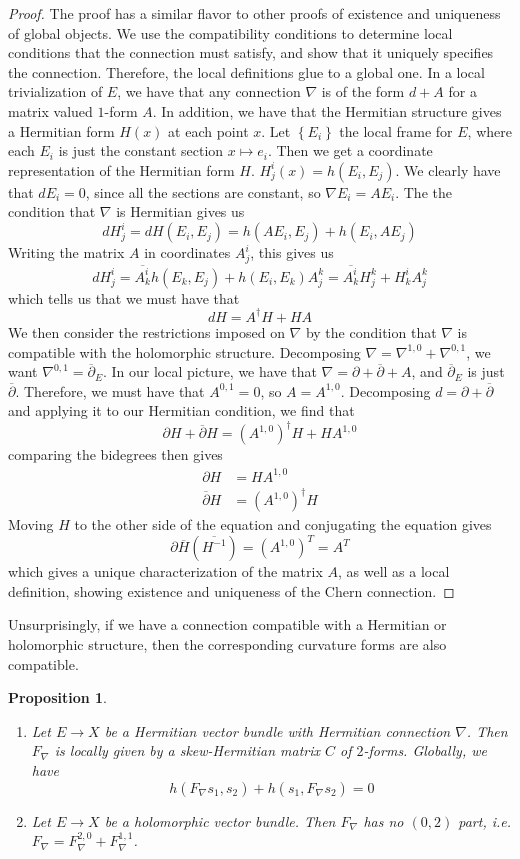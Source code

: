 \documentclass[psamsfonts, 12pt]{amsart}
\newtheorem{prop}[thm]{Proposition}
\theoremstyle{definition}
\theoremstyle{remark}
\newcommand{\dbar}{\overline{\partial}}
\newcommand{\inv}{^{-1}}
\newcommand{\set}[1]{\left\lbrace #1 \right\rbrace}
\newcommand{\enumbreak}{\ \\ \vspace{-\baselineskip}}
\begin{document}
\begin{proof}
The proof has a similar flavor to other proofs of existence and uniqueness of global
objects. We use the compatibility conditions to determine local conditions that
the connection must satisfy, and show that it uniquely specifies the connection.
Therefore, the local definitions glue to a global one. In a local trivialization
of $E$, we have that any connection $\nabla$ is of the form $d + A$ for a matrix
valued $1$-form $A$. In addition, we have that the Hermitian structure gives a
Hermitian form $H(x)$ at each point $x$. Let $\set{E_i}$ the local
frame for $E$, where each $E_i$ is just the constant section $x \mapsto e_i$. Then we
get a coordinate representation of the Hermitian form $H$.
$H^i_j(x) = h(E_i,E_j)$. We clearly have that $dE_i = 0$, since all the sections
are constant, so $\nabla E_i = AE_i$. The the condition that $\nabla$ is Hermitian gives
us
\[
dH^i_j  = dH(E_i,E_j) = h(AE_i, E_j) + h(E_i, AE_j)
\]
Writing the matrix $A$ in coordinates $A^i_j$, this gives us
\[
dH^i_j = \overline{A^i_k}h(E_k, E_j) + h(E_i, E_k)A^k_j
= \overline{A^i_k}H^k_j + H^i_kA^k_j
\]
which tells us that we must have that
\[
dH = A^\dagger H + HA
\]
We then consider the restrictions imposed on $\nabla$ by the condition that
$\nabla$ is compatible with the holomorphic structure. Decomposing
$\nabla = \nabla^{1,0} + \nabla^{0,1}$, we want $\nabla^{0,1} = \dbar_E$. In our local
picture, we have that $\nabla = \partial + \dbar + A$, and $\dbar_E$ is just $\dbar$.
Therefore, we must have that $A^{0,1} = 0$, so $A = A^{1,0}$. Decomposing
$d = \partial + \dbar$ and applying it to our Hermitian condition, we find that
\[
\partial H + \dbar H = (A^{1,0})^\dagger H + HA^{1,0}
\]
comparing the bidegrees then gives
\begin{align*}
\partial H &= HA^{1,0}\\
\dbar H &= (A^{1,0})^\dagger H
\end{align*}
Moving $H$ to the other side of the equation and conjugating the equation gives
\[
\partial\overline{H} (\overline{H\inv}) = (A^{1,0})^T = A^T
\]
which gives a unique characterization of the matrix $A$, as well as a local definition,
showing existence and uniqueness of the Chern connection.
\end{proof}
%
Unsurprisingly, if we have a connection compatible with a Hermitian or holomorphic
structure, then the corresponding curvature forms are also compatible.
%
\begin{prop} \enumbreak
\begin{enumerate}
  \item Let $E \to X$ be a Hermitian vector bundle with Hermitian connection $\nabla$.
  Then $F_\nabla$ is locally given by a skew-Hermitian matrix $C$ of $2$-forms.
  Globally, we have
  \[
  h(F_\nabla s_1, s_2) + h(s_1, F_\nabla s_2) = 0
  \]
  \item Let $E \to X$ be a holomorphic vector bundle. Then $F_\nabla$ has
  no $(0,2)$ part, i.e. $F_\nabla = F^{2,0}_\nabla + F^{1,1}_\nabla$.
\end{enumerate}
\end{prop}
\end{document}
